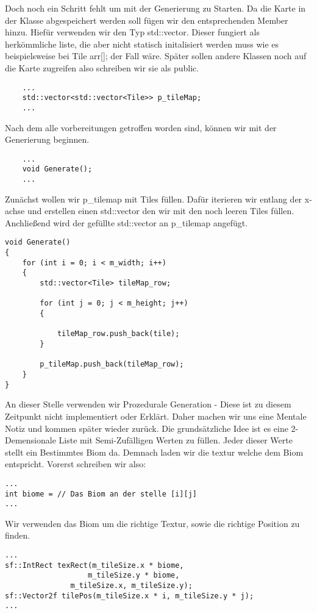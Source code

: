 Doch noch ein Schritt fehlt um mit der Generierung zu Starten. Da die Karte in der Klasse abgespeichert werden soll fügen wir den entsprechenden Member hinzu. 
Hiefür verwenden wir den Typ std::vector. Dieser fungiert als herkömmliche liste, die aber nicht statisch initalisiert werden muss wie es beispielsweise bei 
Tile arr[]; der Fall wäre. Später sollen andere Klassen noch auf die Karte zugreifen also schreiben wir sie als public. 
\begin{lstlisting}
	...
	std::vector<std::vector<Tile>> p_tileMap;
	...
\end{lstlisting}


Nach dem alle vorbereitungen getroffen worden sind, können wir mit der Generierung beginnen. 

\begin{lstlisting}
	...
	void Generate();
	...
\end{lstlisting}

Zunächst wollen wir p\_tilemap mit Tiles füllen. Dafür iterieren wir entlang der x-achse und erstellen einen std::vector den wir mit den noch leeren Tiles füllen. Anchließend wird der gefüllte std::vector an p\_tilemap angefügt.

\begin{lstlisting}
void Generate()
{
	for (int i = 0; i < m_width; i++)
	{
		std::vector<Tile> tileMap_row;
		
		for (int j = 0; j < m_height; j++)
		{
			
			tileMap_row.push_back(tile);
		}
		
		p_tileMap.push_back(tileMap_row);
	}
}
\end{lstlisting}
An dieser Stelle verwenden wir Prozedurale Generation - Diese ist zu diesem Zeitpunkt nicht implementiert oder Erklärt. Daher machen wir uns eine Mentale Notiz und 
kommen später wieder zurück. Die grundsätzliche Idee ist es eine 2-Demensionale Liste mit Semi-Zufälligen Werten zu füllen. Jeder dieser Werte stellt ein Bestimmtes Biom da. Demnach laden wir die textur welche dem Biom entspricht. Vorerst schreiben wir also: 
\begin{lstlisting}
...
int biome = // Das Biom an der stelle [i][j]
...
\end{lstlisting}

Wir verwenden das Biom um die richtige Textur, sowie die richtige Position zu finden. 
\begin{lstlisting}
...
sf::IntRect texRect(m_tileSize.x * biome, 
		           m_tileSize.y * biome, 
			   m_tileSize.x, m_tileSize.y);
sf::Vector2f tilePos(m_tileSize.x * i, m_tileSize.y * j);
...
\end{lstlisting}

